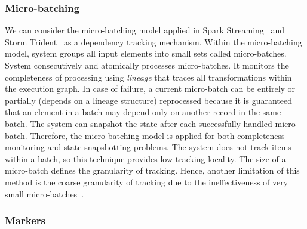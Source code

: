 \subsubsection{Micro-batching}

We can consider the micro-batching model applied in Spark Streaming~\cite{Zaharia:2012:DSE:2342763.2342773} and Storm Trident~\cite{apache:storm:trident} as a dependency tracking mechanism. Within the micro-batching model, system groups all input elements into small sets called micro-batches. System consecutively and atomically processes micro-batches. It monitors the completeness of processing using {\em lineage} that traces all transformations within the execution graph. In case of failure, a current micro-batch can be entirely or partially (depends on a lineage structure) reprocessed because it is guaranteed that an element in a batch may depend only on another record in the same batch. The system can snapshot the state after each successfully handled micro-batch. Therefore, the micro-batching model is applied for both completeness monitoring and state snapshotting problems. The system does not track items within a batch, so this technique provides low tracking locality. The size of a micro-batch defines the granularity of tracking. Hence, another limitation of this method is the coarse granularity of tracking due to the ineffectiveness of very small micro-batches~\cite{Zaharia:2012:DSE:2342763.2342773}.

\subsubsection{Markers}

